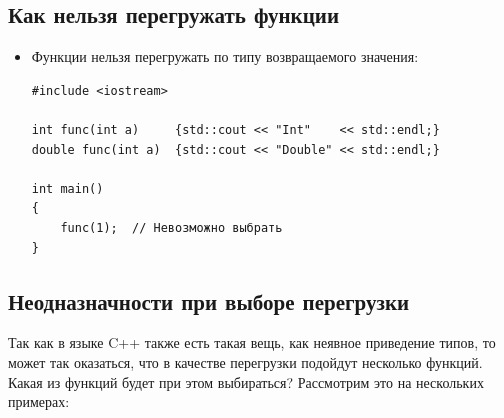 \documentclass{article}
\begin{document}
\subsection*{Как нельзя перегружать функции}

\begin{itemize}
\item Функции нельзя перегружать по типу возвращаемого значения:
\begin{lstlisting}
#include <iostream>

int func(int a)     {std::cout << "Int"    << std::endl;}
double func(int a)  {std::cout << "Double" << std::endl;}

int main()
{
    func(1);  // Невозможно выбрать
}
\end{lstlisting}
\end{itemize}


\newpage
\subsection*{Неодназначности при выборе перегрузки}
Так как в языке C++ также есть такая вещь, как неявное приведение типов, то может так оказаться, что в качестве перегрузки подойдут несколько функций. Какая из функций будет при этом выбираться? Рассмотрим это на нескольких примерах:
\end{document}
